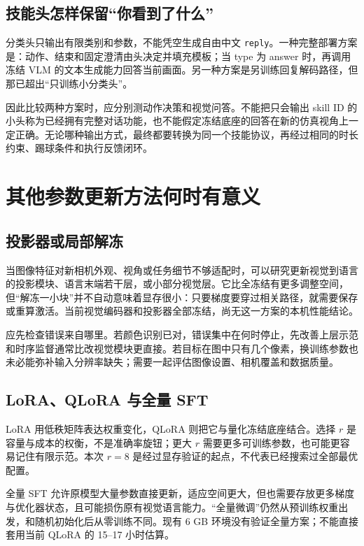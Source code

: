 \subsection{技能头怎样保留“你看到了什么”}

分类头只输出有限类别和参数，不能凭空生成自由中文 \texttt{reply}。一种完整部署方案是：动作、结束和固定澄清由头决定并填充模板；当 type 为 answer 时，再调用冻结 VLM 的文本生成能力回答当前画面。另一种方案是另训练回复解码路径，但那已超出“只训练小分类头”。

因此比较两种方案时，应分别测动作决策和视觉问答。不能把只会输出 skill ID 的小头称为已经拥有完整对话功能，也不能假定冻结底座的回答在新的仿真视角上一定正确。无论哪种输出方式，最终都要转换为同一个技能协议，再经过相同的时长约束、踢球条件和执行反馈闭环。

\section{其他参数更新方法何时有意义}

\subsection{投影器或局部解冻}

当图像特征对新相机外观、视角或任务细节不够适配时，可以研究更新视觉到语言的投影模块、语言末端若干层，或小部分视觉层。它比全冻结有更多调整空间，但“解冻一小块”并不自动意味着显存很小：只要梯度要穿过相关路径，就需要保存或重算激活。当前视觉编码器和投影器全部冻结，尚无这一方案的本机性能结论。

应先检查错误来自哪里。若颜色识别已对，错误集中在何时停止，先改善上层示范和时序监督通常比改视觉模块更直接。若目标在图中只有几个像素，换训练参数也未必能弥补输入分辨率缺失；需要一起评估图像设置、相机覆盖和数据质量。

\subsection{LoRA、QLoRA 与全量 SFT}

LoRA 用低秩矩阵表达权重变化，QLoRA 则把它与量化冻结底座结合。选择 $r$ 是容量与成本的权衡，不是准确率旋钮；更大 $r$ 需要更多可训练参数，也可能更容易记住有限示范。本次 $r=8$ 是经过显存验证的起点，不代表已经搜索过全部最优配置。\cite{lora-paper,qlora-paper}

全量 SFT 允许原模型大量参数直接更新，适应空间更大，但也需要存放更多梯度与优化器状态，且可能损伤原有视觉语言能力。“全量微调”仍然从预训练权重出发，和随机初始化后从零训练不同。现有 6 GB 环境没有验证全量方案；不能直接套用当前 QLoRA 的 15--17 小时估算。

